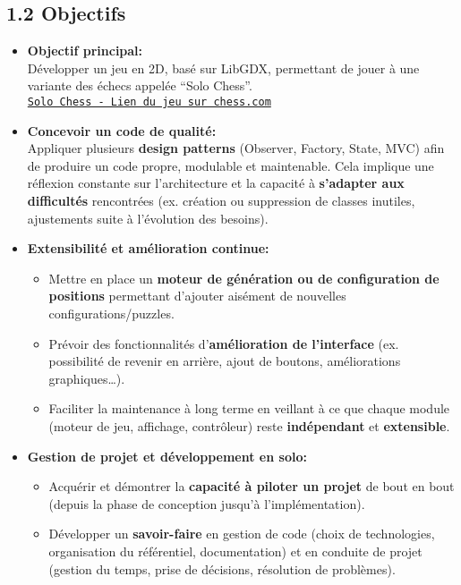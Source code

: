 \documentclass[11pt,a4paper]{article}
\begin{document}
\subsection*{1.2 Objectifs}
\begin{itemize}[leftmargin=1.5em]
    \item \textbf{Objectif principal:}\\
    Développer un jeu en 2D, basé sur LibGDX, permettant de jouer à une variante des échecs appelée “Solo Chess”.\\
    \href{https://www.chess.com/solo-chess}{\texttt{Solo Chess - Lien du jeu sur chess.com}}

    \item \textbf{Concevoir un code de qualité:}\\
    Appliquer plusieurs \textbf{design patterns} (Observer, Factory, State, MVC) afin de produire un code propre, modulable et maintenable. Cela implique une réflexion constante sur l’architecture et la capacité à \textbf{s’adapter aux difficultés} rencontrées (ex. création ou suppression de classes inutiles, ajustements suite à l’évolution des besoins).

    \item \textbf{Extensibilité et amélioration continue:}
    \begin{itemize}
        \item Mettre en place un \textbf{moteur de génération ou de configuration de positions} permettant d’ajouter aisément de nouvelles configurations/puzzles.
        \item Prévoir des fonctionnalités d’\textbf{amélioration de l’interface} (ex. possibilité de revenir en arrière, ajout de boutons, améliorations graphiques…).
        \item Faciliter la maintenance à long terme en veillant à ce que chaque module (moteur de jeu, affichage, contrôleur) reste \textbf{indépendant} et \textbf{extensible}.
    \end{itemize}

    \item \textbf{Gestion de projet et développement en solo:}
    \begin{itemize}
        \item Acquérir et démontrer la \textbf{capacité à piloter un projet} de bout en bout (depuis la phase de conception jusqu’à l’implémentation).
        \item Développer un \textbf{savoir-faire} en gestion de code (choix de technologies, organisation du référentiel, documentation) et en conduite de projet (gestion du temps, prise de décisions, résolution de problèmes).
    \end{itemize}
\end{itemize}
\end{document}
